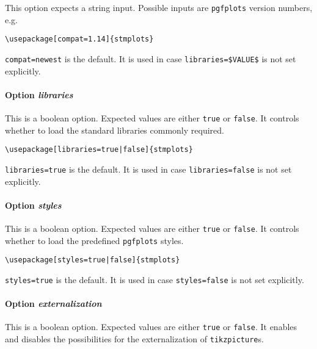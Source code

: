 \documentclass[%
  type=article,%
  layout=koma,%
  date=true,%
  hyperref=true,%
  listings=true,%
  math=true,%
  plots=false,%
]{stmtext}
\begin{document}
This option expects a string input. Possible inputs are \texttt{pgfplots} version numbers, e.g.

\begin{verbatim}
\usepackage[compat=1.14]{stmplots}
\end{verbatim}

\texttt{compat=newest} is the default. It is used in case \verb+libraries=$VALUE$+ is not set explicitly.

\paragraph{Option \protect\textit{libraries}} 
\label{sec:usage:preamble:wholepackage:options:libraries}

This is a boolean option. Expected values are either \texttt{true} or \texttt{false}. It controls whether to load the standard libraries commonly required.

\begin{verbatim}
\usepackage[libraries=true|false]{stmplots}
\end{verbatim}

\texttt{libraries=true} is the default. It is used in case \texttt{libraries=false} is not set explicitly.

\paragraph{Option \protect\textit{styles}} 
\label{sec:usage:preamble:wholepackage:options:styles}

This is a boolean option. Expected values are either \texttt{true} or \texttt{false}. It controls whether to load the predefined \texttt{pgfplots} styles.

\begin{verbatim}
\usepackage[styles=true|false]{stmplots}
\end{verbatim}

\texttt{styles=true} is the default. It is used in case \texttt{styles=false} is not set explicitly.

\paragraph{Option \protect\textit{externalization}} 
\label{sec:usage:preamble:wholepackage:options:externalization}

This is a boolean option. Expected values are either \texttt{true} or \texttt{false}. It enables and disables the possibilities for the externalization of \texttt{tikzpicture}s.
\end{document}
